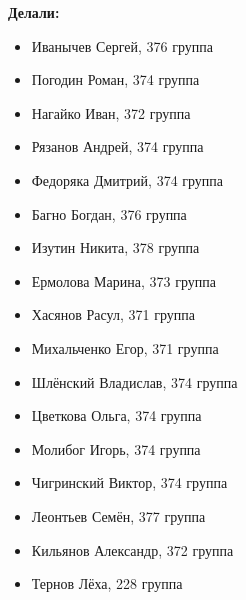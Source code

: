 \documentclass[12pt]{article}
\theoremstyle{plain}
\theoremstyle{definition}
\theoremstyle{remark}
\begin{document}
\centering
\begin{varwidth}{\textwidth}

  \centering
  \textbf{\large Делали:}

  \begin{itemize}
    \item Иванычев Сергей, 376 группа
    \item Погодин Роман, 374 группа
    \item Нагайко Иван, 372 группа
    \item Рязанов Андрей, 374 группа
    \item Федоряка Дмитрий, 374 группа
    \item Багно Богдан, 376 группа
    \item Изутин Никита, 378 группа
    \item Ермолова Марина, 373 группа
    \item Хасянов Расул, 371 группа
    \item Михальченко Егор, 371 группа
    \item Шлёнский Владислав, 374 группа
    \item Цветкова Ольга, 374 группа
    \item Молибог Игорь, 374 группа
    \item Чигринский Виктор, 374 группа
    \item Леонтьев Семён, 377 группа
    \item Кильянов Александр, 372 группа 
    \item Тернов Лёха, 228 группа
  \end{itemize}
\end{varwidth}
\end{document}
